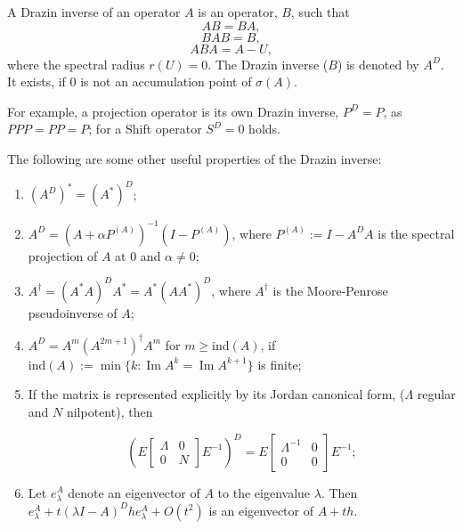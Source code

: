\documentclass[12pt]{article}
\begin{document}
A Drazin inverse of an operator $A$ is an operator, $B$, such that
$$A B = B A,$$
$$B A B= B,$$
$$A B A= A- U,$$
where the spectral radius $r(U)=0$. The Drazin inverse ($B$) is denoted by $A^D$. It exists, if $0$ is not an accumulation point of $\sigma (A)$.

For example, a projection operator is its own Drazin inverse, $P^D=P$, as
$PPP = PP = P$; for a Shift operator $S^D=0$ holds.

The following are some other useful properties of the Drazin inverse: 
\begin{enumerate}
 \item $(A^D)^*= (A^*)^D$;
 \item $A^D= (A+ \alpha P^{(A)})^{-1} (I- P^{(A)})$, where $P^{(A)}:= I-A^D A$ is the spectral projection of $A$ at $0$ and $\alpha \neq 0$;
 \item $A^{\dagger}= (A^* A)^D A^* = A^* (A A^* )^D$, where $A^{\dagger}$ is the Moore-Penrose pseudoinverse of $A$;
 \item $A^D= A^m (A^{2m+1})^{\dagger} A^m$ for $m \ge \mbox{ind}(A)$, if      $\mbox{ind}(A):= \min \{ k: \operatorname{Im} A^k = \operatorname{Im} A^{k+1} \}$ is finite;
\item If the matrix is represented explicitly by its Jordan canonical form, ($\Lambda$ regular and $N$ nilpotent), then

$$\left( E \begin{bmatrix} \Lambda & 0 \\ 0 & N \end{bmatrix} E^{-1} \right)^D = E \begin{bmatrix} \Lambda^{-1} & 0 \\ 0 & 0 \end{bmatrix} E^{-1};$$
\item Let $e_{\lambda}^A$ denote an eigenvector of $A$ to the eigenvalue $\lambda$. Then $e_{\lambda}^A+t (\lambda I- A)^D h e_{\lambda}^A + O(t^2)$ is an eigenvector of $A+ t h$.
\end{enumerate}
\end{document}
